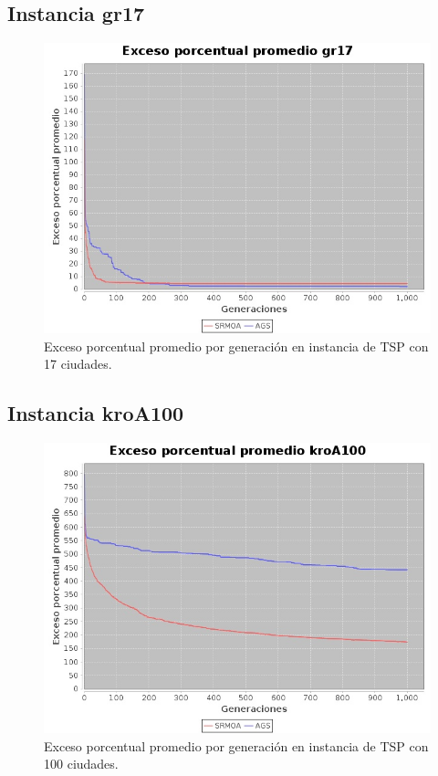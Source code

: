 \documentclass[12pt]{article}
\begin{document}
\subsection{Instancia gr17}
\begin{figure}[H]
  \centering
  \includegraphics[width=1\textwidth]{graficas/gr17}
  \caption{Exceso porcentual promedio por generación en instancia de TSP con 17 ciudades.}
\end{figure}
\subsection{Instancia kroA100}
\begin{figure}[H]
  \centering
  \includegraphics[width=1\textwidth]{graficas/kroA100}
  \caption{Exceso porcentual promedio por generación en instancia de TSP con 100 ciudades.}
\end{figure}
\end{document}
